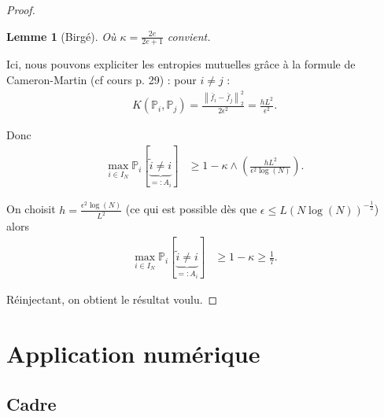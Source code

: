 \documentclass[11pt,letterpaper]{article}
\newtheorem{lemme}{Lemme}
\begin{document}
\begin{proof}
\begin{lemme}[Birgé]
\par Où $\kappa = \frac{2 e }{2 e + 1}$ convient.
\end{lemme}

\par Ici, nous pouvons expliciter les entropies mutuelles grâce à la formule de Cameron-Martin (cf cours p. 29) : pour $i \neq j$ :
\begin{equation}
	\begin{split}
		K \left( \mathbb{P}_i, \mathbb{P}_j \right) = \frac{\left\| \bar{f}_i - \bar{f}_j \right\|_2^2}{2 \epsilon^2} = \frac{h L^2}{\epsilon^2} .
	\end{split}
\end{equation}

\par Donc 
\begin{equation}
	\begin{split}
		\max\limits_{i \in I_N} \mathbb{P}_i \left[ \underbrace{ \tilde{i} \neq i }_{=: A_i} \right] & \geq 1 - \kappa \wedge \left( \frac{h L^2}{\epsilon^2 \log \left( N \right)} \right) .
	\end{split}
\end{equation}

\par On choisit $h = \frac{\epsilon^2 \log \left( N \right)}{L^2}$ (ce qui est possible dès que $\epsilon \leq L \left( N \log
 \left( N \right) \right)^{-\frac{1}{2}}$) alors 
\begin{equation}
	\begin{split}
		\max\limits_{i \in I_N} \mathbb{P}_i \left[ \underbrace{ \tilde{i} \neq i }_{=: A_i} \right] & \geq 1 - \kappa \geq \frac{1}{7} .
	\end{split}
\end{equation}

\par Réinjectant, on obtient le résultat voulu.

\end{proof}



\section{Application numérique}

\subsection{Cadre}
\end{document}
